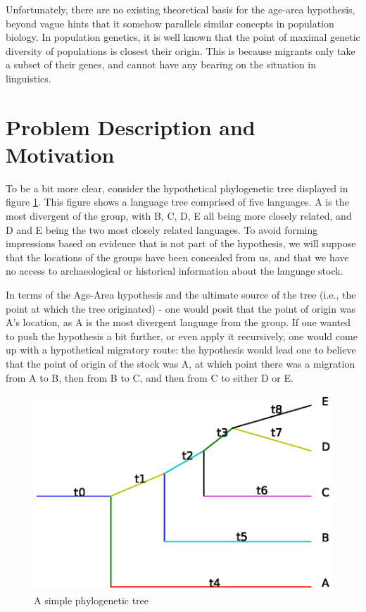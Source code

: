 \documentclass[11pt]{article}
\begin{document}
Unfortunately, there are no existing theoretical basis for the age-area hypothesis, beyond vague hints that it somehow parallels similar concepts in population biology. In population genetics, it is well known that the point of maximal genetic diversity of populations is closest their origin. This is because migrants only take a subset of their genes, and cannot have any bearing on the situation
in linguistics.

\section{Problem Description and Motivation}

To be a bit more clear, consider the hypothetical phylogenetic tree displayed in figure \ref{fig1}. This figure shows a language tree comprised
of five languages. A is the most divergent of the group, with B, C, D, E all being more closely related, and D and E being the two most closely
related languages. To avoid forming impressions based on evidence that is not part of the hypothesis, we will suppose that the locations of the
groups have been concealed from us, and that we have no access to archaeological or historical information about the language stock.

In terms of the Age-Area hypothesis and the ultimate source of the tree (i.e., the point at which the tree originated) - one would posit that the point of origin was A's location, as A is the most divergent language from the group. If one wanted to push the hypothesis a bit further, or even apply it recursively, one would come up with a hypothetical migratory route: the hypothesis would lead one to believe that the point of origin of the stock was A, at which point there was a migration from A to B, then from B to C, and then from C to either D or E.

\begin{figure}
\begin{center}
\includegraphics[width=\textwidth]{simplePT.eps}
\caption{A simple phylogenetic tree}
\end{center} \label{fig1}
\end{figure}
\end{document}
